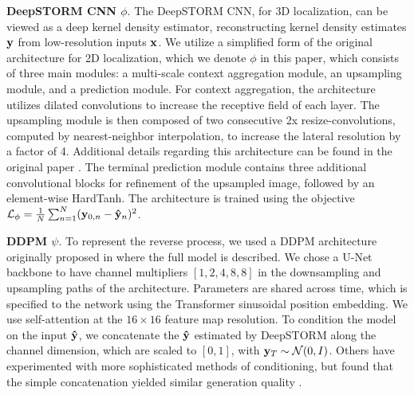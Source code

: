 \documentclass{article}
\begin{document}
\textbf{DeepSTORM CNN $\phi$}. The DeepSTORM CNN, for 3D localization, can be viewed as a deep kernel density estimator, reconstructing kernel density estimates $\bold{y}$ from low-resolution inputs $\bold{x}$. We utilize a simplified form of the original architecture for 2D localization, which we denote $\phi$ in this paper, which consists of three main modules: a multi-scale context aggregation module, an upsampling module, and a prediction module. For context aggregation, the architecture utilizes dilated convolutions to increase the receptive field of each layer. The upsampling module is then composed of two consecutive 2x resize-convolutions, computed by nearest-neighbor interpolation, to increase the lateral resolution by a factor of 4. Additional details regarding this architecture can be found in the original paper \cite{Nehme2020}. The terminal prediction module contains three additional convolutional blocks for refinement of the upsampled image, followed by an element-wise HardTanh. The architecture is trained using the objective $\mathcal{L}_{\phi} = \frac{1}{N}\sum_{n=1}^{N} (\bold{y}_{0,n}-\bold{\hat{y}}_{n})^{2}$. 

\textbf{DDPM $\psi$}. To represent the reverse process, we used a DDPM architecture originally proposed in \citep{Saharia2021} where the full model is described. We chose a U-Net backbone to have channel multipliers $[1,2,4,8,8]$ in the downsampling and upsampling paths of the architecture. Parameters are shared across time, which is specified to the network using the Transformer sinusoidal position embedding. We use self-attention at the $16 \times 16$ feature map resolution. To condition the model on the input $\bold{\hat{y}}$, we concatenate the $\bold{\hat{y}}$ estimated by DeepSTORM along the channel dimension, which are scaled to $[0,1]$, with $\bold{y}_T\sim \mathcal{N}(0, I)$. Others have experimented with more sophisticated methods of conditioning, but found that the simple concatenation yielded similar generation quality \citep{Saharia2021}. 
\end{document}
